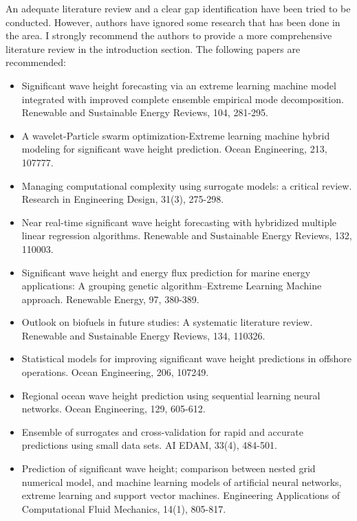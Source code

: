 \documentclass[a4paper,twoside,11pt]{article}
\newcounter{comments}[section]
\newcommand{\rcomment}[1]
{
	\stepcounter{comments}
	\vspace{0.6cm}
	\begin{tcolorbox}[colback=black!5,colframe=white!45!black,title=Comment \arabic{comments}]
		#1
	\end{tcolorbox}
}
\begin{document}
\rcomment
{
An adequate literature review and a clear gap identification have been tried to be conducted. However, authors have ignored some research that has been done in the area. I strongly recommend the authors to provide a more comprehensive literature review in the introduction section. The following papers are recommended:

\begin{itemize}
    \item Significant wave height forecasting via an extreme learning machine model integrated with improved complete ensemble empirical mode decomposition. Renewable and Sustainable Energy Reviews, 104, 281-295. 
    \item A wavelet-Particle swarm optimization-Extreme learning machine hybrid modeling for significant wave height prediction. Ocean Engineering, 213, 107777.
    \item Managing computational complexity using surrogate models: a critical review. Research in Engineering Design, 31(3), 275-298.
    \item Near real-time significant wave height forecasting with hybridized multiple linear regression algorithms. Renewable and Sustainable Energy Reviews, 132, 110003.
    \item Significant wave height and energy flux prediction for marine energy applications: A grouping genetic algorithm–Extreme Learning Machine approach. Renewable Energy, 97, 380-389.
    \item Outlook on biofuels in future studies: A systematic literature review. Renewable and Sustainable Energy Reviews, 134, 110326.
    \item Statistical models for improving significant wave height predictions in offshore operations. Ocean Engineering, 206, 107249.
    \item Regional ocean wave height prediction using sequential learning neural networks. Ocean Engineering, 129, 605-612.
    \item Ensemble of surrogates and cross-validation for rapid and accurate predictions using small data sets. AI EDAM, 33(4), 484-501.
    \item Prediction of significant wave height; comparison between nested grid numerical model, and machine learning models of artificial neural networks, extreme learning and support vector machines. Engineering Applications of Computational Fluid Mechanics, 14(1), 805-817.
\end{itemize}
}
\end{document}

